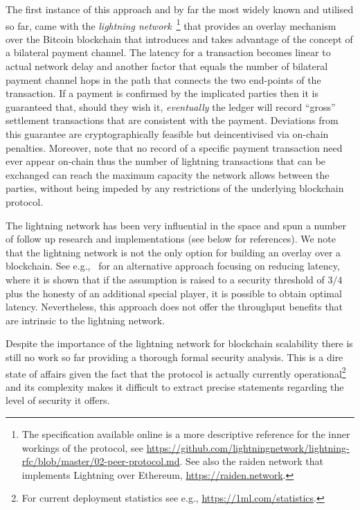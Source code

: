 The first instance of this approach and by far the most widely known and
utilised so far, came with the \emph{lightning
network}~\cite{lightning}\footnote{The specification available online is a more
descriptive reference for the inner workings of the protocol, see
\url{https://github.com/lightningnetwork/lightning-rfc/blob/master/02-peer-protocol.md}.
See also the raiden network that implements Lightning over Ethereum,
\url{https://raiden.network}.} that provides an overlay mechanism over the
Bitcoin blockchain that introduces and takes advantage of the concept of a
bilateral payment channel. The latency for a transaction becomes linear to
actual network delay and another factor that equals the number of bilateral
payment channel hops in the path that connects the two end-points of the
transaction. If a payment is confirmed by the implicated parties then it is
guaranteed that, should they wish it, \emph{eventually} the ledger will record
``gross'' settlement transactions that are consistent with the payment.
Deviations from this guarantee are cryptographically feasible but deincentivised
via on-chain penalties. Moreover, note that no record of a specific payment
transaction need ever appear on-chain thus the number of lightning transactions
that can be exchanged can reach the maximum capacity the network allows between
the parties, without being impeded by any restrictions of the underlying
blockchain protocol.

The lightning network has been very influential in the space and spun a number
of follow up research and implementations (see below for references). We note
that the lightning network is not the only option for building an overlay over a
blockchain. See e.g.,~\cite{DBLP:conf/eurocrypt/PassS18} for an alternative
approach focusing on reducing latency, where it is shown that if the assumption
is raised to a security threshold of $3/4$ plus the honesty of an additional
special player, it is possible to obtain optimal latency. Nevertheless, this
approach does not offer the throughput benefits that are intrinsic to the
lightning network.

Despite the importance of the lightning network for blockchain scalability there
is still no work so far providing a thorough formal security analysis. This is a
dire state of affairs given the fact that the protocol is actually currently
operational\footnote{For current deployment statistics see e.g.,
\url{https://1ml.com/statistics}.} and its complexity makes it difficult to
extract precise statements regarding the level of security it offers.

